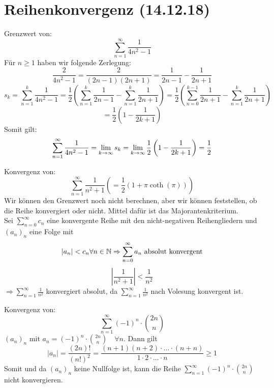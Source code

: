 \documentclass[../ana1u.tex]{subfiles}
\begin{document}
\setcounter{section}{7}

\section{Reihenkonvergenz (14.12.18)}
\begin{bsp}
    Grenzwert von:
    \[\sum_{n=1}^{\infty} \frac{1}{4n^2 - 1}\]
    Für \(n \geq 1\) haben wir folgende Zerlegung:
    \[\frac{2}{4n^2 - 1} = \frac{2}{(2n - 1)(2n + 1)} = \frac{1}{2n-1} - \frac{1}{2n+1}\]
    \[s_k = \sum_{n=1}^{k} \frac{1}{4n^2-1} = \frac{1}{2}\left(\sum_{n=1}^{k} \frac{1}{2n-1} - \sum_{n=1}^{k} \frac{1}{2n+1} \right) = \frac{1}{2}\left(\sum_{n=0}^{k-1} \frac{1}{2n+1} - \sum_{n=1}^{k} \frac{1}{2n+1} \right)\]
    \[= \frac{1}{2}\left(1 - \frac{1}{2k+1}\right)\]
    Somit gilt:
    \[\sum_{n=1}^{\infty} \frac{1}{4n^2 - 1} = \lim\limits_{k\rightarrow\infty} s_k = \lim\limits_{k\rightarrow\infty} \frac{1}{2}\left(1 - \frac{1}{2k+1}\right) = \frac{1}{2} \]
\end{bsp}
\begin{bsp}
    Konvergenz von:
    \[\sum_{n=1}^{\infty} \frac{1}{n^2+1} \left(= \frac{1}{2}(1 + \pi \coth(\pi)) \right)\]
    Wir können den Grenzwert noch nicht berechnen, aber wir können feststellen, ob die Reihe konvergiert oder nicht. Mittel dafür ist das Majorantenkriterium.\\
    Sei \(\sum_{n=0}^{\infty}c_n \) eine konvergente Reihe mit den nicht-negativen Reihengliedern und \((a_n)_n\) eine Folge mit
    \[|a_n| < c_n \forall n \in \mathbb{N} \Rightarrow \sum_{n=0}^{\infty} a_n \text{ absolut konvergent}\]
    \[\left|\frac{1}{n^2+1}\right| < \frac{1}{n^2}\]
    \(\Rightarrow \sum_{n=1}^{\infty} \frac{1}{n^2}\) konvergiert absolut, da \(\sum_{n=1}^{\infty} \frac{1}{n^2}\) nach Volesung konvergent ist.
\end{bsp}
\begin{bsp}
    Konvergenz von:\[\sum_{n=1}^{\infty} (-1)^n \cdot \binom{2n}{n}\]
    \((a_n)_n\) mit \(a_n = (-1)^n \cdot \binom{2n}{n} \quad \forall n\). Dann gilt
    \[|a_n| = \frac{(2n)!}{(n!)^2} = \frac{(n+1)(n+2) \cdot \hdots \cdot (n+n)}{1 \cdot 2 \cdot \hdots \cdot n} \geq 1\]
    Somit und da \((a_n)_n\) keine Nullfolge ist, kann die Reihe \(\sum_{n=1}^{\infty} (-1)^n \cdot \binom{2n}{n}\) nicht konvergieren.
\end{bsp}
\end{document}
